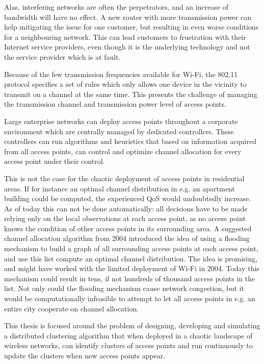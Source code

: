 Alas, interfering networks are often the perpetrators, and an increase of bandwidth will have no effect. A new router with more transmission power can help mitigating the issue
for one customer, but resulting in even worse conditions for a neighbouring network. This can lead customers to frustration with their Internet service providers, even though it is the underlying technology and not the service provider which is at fault.


Because of the few transmission frequencies available for Wi-Fi, the 802.11 protocol specifies a set of rules which only allows one device in the vicinity to transmit on a channel at the same time. 
This presents the challenge of managing the transmission channel and transmission power level of access points.

Large enterprise networks can deploy access points throughout a corporate environment which are centrally managed by dedicated controllers. These controllers can run 
algorithms and heuristics that based on information acquired from all access points, can control and optimize channel allocation for every access point under their control. 

This is not the case for the chaotic deployment of access points in residential areas. If for instance an optimal channel distribution in e.g. an apartment building could be computed,
the experienced QoS would undoubtedly increase. As of today this can not be done automatically: all decisions 
have to be made relying only on the local observations at each access point, as no access point knows the condition of other access points in its surrounding area. A suggested channel allocation algorithm from 2004 \cite{mahonen} introduced the idea of using a flooding mechanism to build a graph of all surrounding access points at each access point,
and use this list compute an optimal channel distribution. The idea is promising, and might have worked with the limited deployment of Wi-Fi in 2004.
Today this mechanism could result in tens, if not hundreds of thousand access points in the list. Not only could the flooding mechanism cause network congestion, but it would be computationally infeasible to attempt to let all access points in e.g. an entire city cooperate on channel allocation. 

This thesis is focused around the problem of designing, developing and simulating a distributed clustering algorithm that
when deployed in a chaotic landscape of wireless networks, can identify clusters of access points and run continuously to update the clusters when new access points appear. 




